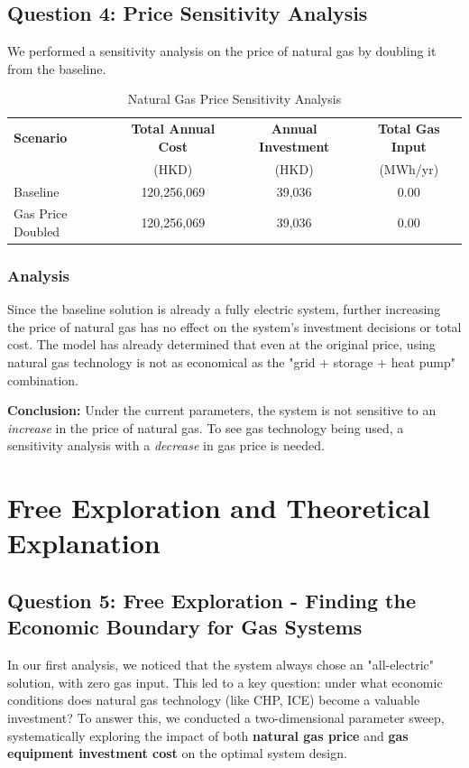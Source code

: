 \documentclass[12pt, a4paper]{article}
\begin{document}
\subsection{Question 4: Price Sensitivity Analysis}
We performed a sensitivity analysis on the price of natural gas by doubling it from the baseline.

\begin{table}[h!]
	\centering
	\caption{Natural Gas Price Sensitivity Analysis}
	\begin{tabular}{lccc}
		\toprule
		\textbf{Scenario} & \textbf{Total Annual Cost} & \textbf{Annual Investment} & \textbf{Total Gas Input} \\
		& (HKD) & (HKD) & (MWh/yr) \\
		\midrule
		Baseline & 120,256,069 & 39,036 & 0.00 \\
		Gas Price Doubled & 120,256,069 & 39,036 & 0.00 \\
		\bottomrule
	\end{tabular}
\end{table}

\subsubsection*{Analysis}
Since the baseline solution is already a fully electric system, further increasing the price of natural gas has no effect on the system's investment decisions or total cost. The model has already determined that even at the original price, using natural gas technology is not as economical as the "grid + storage + heat pump" combination.

\textbf{Conclusion:} Under the current parameters, the system is not sensitive to an \textit{increase} in the price of natural gas. To see gas technology being used, a sensitivity analysis with a \textit{decrease} in gas price is needed.

\section{Free Exploration and Theoretical Explanation}

\subsection{Question 5: Free Exploration - Finding the Economic Boundary for Gas Systems}

In our first analysis, we noticed that the system always chose an "all-electric" solution, with zero gas input. This led to a key question: under what economic conditions does natural gas technology (like CHP, ICE) become a valuable investment? To answer this, we conducted a two-dimensional parameter sweep, systematically exploring the impact of both \textbf{natural gas price} and \textbf{gas equipment investment cost} on the optimal system design.
\end{document}
